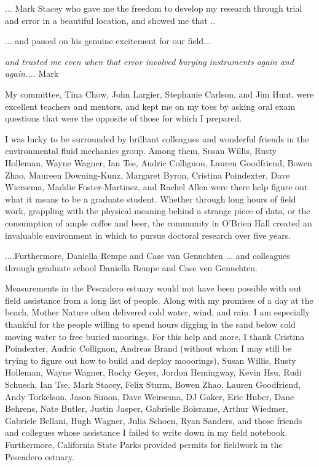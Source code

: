 
... Mark Stacey who gave me the freedom to develop my research through trial and error in a beautiful location, and showed me that .. 

... and passed on his genuine excitement for our field... 

\emph{and trusted me even when that error involved burying instruments again and again...}. Mark 


My committee, Tina Chow, John Largier, Stephanie Carlson, and Jim Hunt, were excellent teachers and mentors, and kept me on my toes by asking oral exam questions that were the opposite of those for which I prepared.

I was lucky to be surrounded by brilliant colleagues and wonderful friends in the environmental fluid mechanics group. Among them, Susan Willis, Rusty Holleman, Wayne Wagner, Ian Tse, Audric Collignon, Lauren Goodfriend, Bowen Zhao, Maureen Downing-Kunz, Margaret Byron, Cristina Poindexter, Dave Wiersema, Maddie Foster-Martinez, and Rachel Allen were there help figure out what it means to be a graduate student.  Whether through long hours of field work, grappling with the physical meaning behind a strange piece of data, or the consumption of ample coffee and beer, the community in O'Brien Hall created an invaluable environment in which to pursue doctoral research over five years. 

....Furthermore, Daniella Rempe and Case van Genuchten 
... and colleagues through graduate school Daniella Rempe and Case ven Genuchten. 

Measurements in the Pescadero estuary would not have been possible with out field assistance from a long list of people. Along with my promises of a day at the beach, Mother Nature often delivered cold water, wind, and rain. I am especially thankful for the people willing to spend hours digging in the sand below cold moving water to free buried moorings. For this help and more, I thank Cristina Poindexter, Audric Collignon, Andreas Brand (without whom I may still be trying to figure out how to build and deploy mooorings), Susan Willis, Rusty Holleman, Wayne Wagner, Rocky Geyer, Jordon Hemingway, Kevin Hsu, Rudi Schuech, Ian Tse, Mark Stacey, Felix Sturm, Bowen Zhao, Lauren Goodfriend, Andy Torkelson, Jason Simon, Dave Weirsema, DJ Gaker, Eric Huber, Dane Behrens, Nate Butler, Justin Jasper, Gabrielle Boisrame, Arthur Wiedmer, Gabriele Bellani, Hugh Wagner, Julia Schoen, Ryan Sanders, and those friends and collegues whose assistance I failed to write down in my field notebook. Furthermore, California State Parks provided permits for fieldwork in the Pescadero estuary.  

